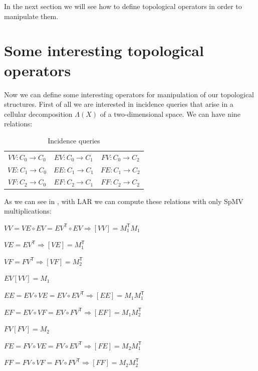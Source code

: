 In the next section we will see how to define topological operators in order to manipulate them.

\section{Some interesting topological operators}\label{sec21:topologicalOperators}

Now we can define some interesting operators for manipulation of our topological structures. First of all we are interested in incidence queries that arise in a cellular decomposition $\Lambda(X)$ of a two-dimensional space. We can have nine relations:

\begin{table}[htbp]
\centering
\caption[Incidence queries]{Incidence queries}
\label{tbl:incidence}
\begin{tabular}{ccc}
$VV \colon C_{0} \rightarrow C_{0}$	&$EV \colon C_{0} \rightarrow C_{1}$	&$FV \colon C_{0} \rightarrow C_{2}$\\ 
$VE \colon C_{1} \rightarrow C_{0}$	&$EE \colon C_{1} \rightarrow C_{1}$	&$FE \colon C_{1} \rightarrow C_{2}$\\
$VF \colon C_{2} \rightarrow C_{0}$	&$EF \colon C_{2} \rightarrow C_{1}$	&$FF \colon C_{2} \rightarrow C_{2}$\\
\end{tabular}
\end{table}

As we can see in \cite{DiCarlo}, with LAR we can compute these relations with only SpMV multiplications:
\begin{description}
 \item $VV = VE \circ EV = EV^{\mathsf{T}} \circ EV \Rightarrow [VV] = M_{1}^{\mathsf{T}}M_{1}$
 \item $VE = EV^{\mathsf{T}} \Rightarrow [VE] = M_{1}^{\mathsf{T}}$ 
 \item $VF = FV^{\mathsf{T}} \Rightarrow [VF] = M_{2}^{\mathsf{T}}$ 
 \item $EV [VV] = M_{1}$ 
 \item $EE = EV \circ VE = EV \circ EV^{\mathsf{T}} \Rightarrow [EE] = M_{1}M_{1}^{\mathsf{T}}$ 
 \item $EF = EV \circ VF = EV \circ FV^{\mathsf{T}} \Rightarrow [EF] = M_{1}M_{2}^{\mathsf{T}}$ 
 \item $FV [FV] = M_{2}$ 
 \item $FE = FV \circ VE = FV \circ EV^{\mathsf{T}} \Rightarrow [FE] = M_{2}M_{1}^{\mathsf{T}}$ 
 \item $FF = FV \circ VF = FV \circ FV^{\mathsf{T}} \Rightarrow [FF] = M_{2}M_{2}^{\mathsf{T}}$ 
\end{description}

